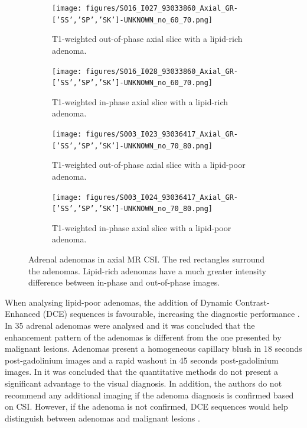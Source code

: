 \documentclass[11pt]{article}
\begin{document}
\begin{figure}
    \centering
    \begin{subfigure}[b]{0.45\textwidth}
        \centering
        \texttt{[image: figures/S016\_I027\_93033860\_Axial\_GR-['SS','SP','SK']-UNKNOWN\_no\_60\_70.png]}
        \caption{T1-weighted out-of-phase axial slice with a lipid-rich adenoma.}
        \label{fig:adenoma_lr_OP}
    \end{subfigure}
    \hfill
    \begin{subfigure}[b]{0.45\textwidth}
        \centering
        \texttt{[image: figures/S016\_I028\_93033860\_Axial\_GR-['SS','SP','SK']-UNKNOWN\_no\_60\_70.png]}
        \caption{T1-weighted in-phase axial slice with a lipid-rich adenoma.}
        \label{fig:adenoma_lr_IP}
    \end{subfigure}
    \vfill
    \begin{subfigure}[b]{0.45\textwidth}
        \centering
        \texttt{[image: figures/S003\_I023\_93036417\_Axial\_GR-['SS','SP','SK']-UNKNOWN\_no\_70\_80.png]}
        \caption{T1-weighted out-of-phase axial slice with a lipid-poor adenoma.}
        \label{fig:adenoma_lp_OP}
    \end{subfigure}
    \hfill
    \begin{subfigure}[b]{0.45\textwidth}
        \centering
        \texttt{[image: figures/S003\_I024\_93036417\_Axial\_GR-['SS','SP','SK']-UNKNOWN\_no\_70\_80.png]}
        \caption{T1-weighted in-phase axial slice with a lipid-poor adenoma.}
        \label{fig:adenoma_lp_IP}
    \end{subfigure}
    \caption{Adrenal adenomas in axial MR CSI. The red rectangles surround the adenomas. Lipid-rich adenomas have a much greater intensity difference between in-phase and out-of-phase images.   }
    \label{fig:adenomas}
\end{figure}

When analysing lipid-poor adenomas, the addition of Dynamic Contrast-Enhanced (DCE) sequences is
favourable, increasing the diagnostic performance \cite{Barat2022}. In
\cite{Chung2001} 35 adrenal adenomas were analysed and it was concluded that the
enhancement pattern of the adenomas is different from the one presented by
malignant lesions. Adenomas present a homogeneous capillary blush in 18 seconds
post-gadolinium images and a rapid washout in 45 seconds post-gadolinium images.
In \cite{Platzek2019} it was concluded that the
quantitative methods do not present a significant advantage to the visual
diagnosis. In addition, the authors do not recommend any additional imaging if
the adenoma diagnosis is confirmed based on CSI. However, if the adenoma is not
confirmed, DCE sequences would help distinguish between adenomas and
malignant lesions \cite{Platzek2019}.
\end{document}
